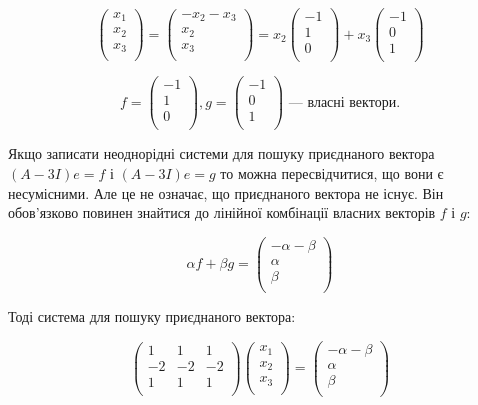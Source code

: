 $$\begin{pmatrix}
	x_1 \\
	x_2 \\
	x_3 \\
\end{pmatrix} = \begin{pmatrix}
	-x_2 - x_3 \\
	x_2 \\
	x_3 \\
\end{pmatrix} = x_2 \begin{pmatrix}
	-1 \\
	1 \\
	0 \\
\end{pmatrix} + x_3 \begin{pmatrix}
	-1 \\
	0 \\
	1 \\
\end{pmatrix} $$

$$f = \begin{pmatrix}
	-1 \\
	1 \\
	0 \\
\end{pmatrix}, g = \begin{pmatrix}
	-1 \\
	0 \\
	1 \\
\end{pmatrix} \text{ --- власні вектори}. $$

Якщо записати неоднорідні системи для пошуку приєднаного вектора
$(A-3I)e = f$ і $(A-3I)e = g$ то можна пересвідчитися, що вони є
несумісними. Але це не означає, що приєднаного вектора не існує. Він
обов’язково повинен знайтися до лінійної комбінації власних векторів $f$ і $g$:

$$\alpha f + \beta g = \begin{pmatrix}
	-\alpha - \beta \\
	\alpha \\
	\beta \\
\end{pmatrix} $$

Тоді система для пошуку приєднаного вектора:

$$\begin{pmatrix}
	1  & 1  & 1  \\
	-2 & -2 & -2 \\
	1  & 1  & 1  \\
\end{pmatrix} \begin{pmatrix}
	x_1 \\
	x_2 \\
	x_3 \\
\end{pmatrix} = \begin{pmatrix}
	-\alpha - \beta \\
	\alpha \\
	\beta \\
\end{pmatrix} $$

